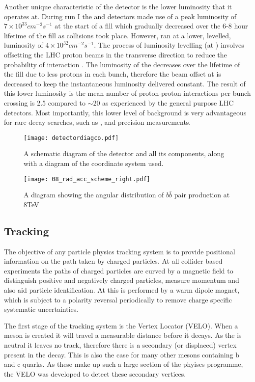 Another unique characteristic of the \lhcb detector is the lower luminosity that it operates at.  During run I the \atlas and \cms detectors made use of a peak luminosity of $7\times 10^{33}cm^{-2}s^{-1}$ at the start of a fill which gradually decreased over the 6-8 hour lifetime of the fill as collisions took place.  However, \lhcb ran at a lower, levelled, luminosity of $4\times 10^{32}cm^{-2}s^{-1}$.  The process of luminosity levelling (at \lhcb) involves offsetting the LHC proton beams in the transverse direction to reduce the probability of interaction \cite{Follin:2014nva}.  The luminosity of the \lhc decreases over the lifetime of the fill due to less protons in each bunch, therefore the beam offset at \lhcb is decreased to keep the instantaneous luminosity delivered constant.  The result of this lower luminosity is the mean number of proton-proton interactions per bunch crossing is 2.5 compared to $ \sim 20$ as experienced by the general purpose LHC detectors.  Most importantly, this lower level of background is very advantageous for rare decay searches, such as \Bs \to \muon \muon, and precision measurements.
\begin{figure}[h]
  \centering
  \texttt{[image: detectordiagco.pdf]}
  \caption{ A schematic diagram of the \lhcb detector and all its components, along with a diagram of the coordinate system used.\cite{detectweb}}
  \label{fig:detectdiag}
\end{figure}
\begin{figure}[h]
  \centering
  \texttt{[image: 08\_rad\_acc\_scheme\_right.pdf]}
  \caption{A diagram showing the angular distribution of $b \bar{b}$ pair production at 8TeV \cite{bbprod}}
  \label{fig:bbarprod}
\end{figure}
\subsection{Tracking}
\label{sec:Tracking}
The objective of any particle physics tracking system is to provide positional information on the path taken by charged particles.  At all collider based experiments the paths of charged particles are curved by a magnetic field to distinguish positive and negatively charged particles, measure momentum and also aid particle identification.  At \lhcb this is performed by a warm dipole magnet, which is subject to a polarity reversal periodically to remove charge specific systematic uncertainties.

The first stage of the \lhcb tracking system is the Vertex Locator (VELO).  When a \Bd meson is created it will travel a measurable distance before it decays.  As the \Bd is neutral it leaves no track, therefore there is a secondary (or displaced) vertex present in the decay.  This is also the case for many other mesons containing b and c quarks.  As these make up such a large section of the \lhcb phyiscs programme, the VELO was developed to detect these secondary vertices.

